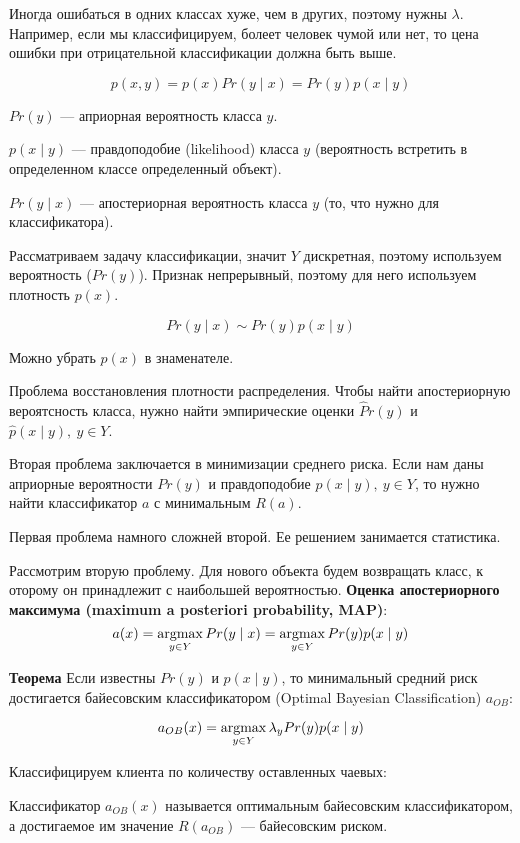 Иногда ошибаться в одних классах хуже, чем в других, поэтому нужны $\lambda$.
Например, если мы классифицируем, болеет человек чумой или нет, то цена ошибки
при отрицательной классификации должна быть выше.

\[
    p(x, y) = p(x) Pr(y \mid x) = Pr(y) p(x \mid y)
\]

$Pr(y)$ --- априорная вероятность класса $y$.

$p(x \mid y)$ --- правдоподобие (likelihood) класса $y$ (вероятность встретить
в определенном классе определенный объект).

$Pr(y \mid x)$ --- апостериорная вероятность класса $y$ (то, что нужно для
классификатора).

Рассматриваем задачу классификации, значит $Y$ дискретная, поэтому используем
вероятность ($Pr(y)$). Признак непрерывный, поэтому для него используем
плотность $p(x)$.

\[
    Pr(y \mid x) \sim Pr(y) p(x \mid y)
\]

Можно убрать $p(x)$ в знаменателе.

Проблема восстановления плотности распределения. Чтобы найти апостериорную
вероятсность класса, нужно найти эмпирические оценки $\hat Pr(y)$ и $\hat 
p(x \mid y),\ y \in Y$.

Вторая проблема заключается в минимизации среднего риска. Если нам даны
априорные вероятности $Pr(y)$ и правдоподобие $p(x \mid y),\ y \in Y$, то нужно
найти классификатор $a$ с минимальным $R(a)$.

Первая проблема намного сложней второй. Ее решением занимается статистика.

Рассмотрим вторую проблему. Для нового объекта будем возвращать класс, к
оторому он принадлежит с наибольшей вероятностью. \textbf{Оценка апостериорного
максимума (maximum a posteriori probability, MAP)}:
\[
    a(x) = \operatorname*{argmax}_{y\in Y} Pr(y \mid x) = \operatorname*{argmax}_{y \in Y} Pr(y) p(x \mid y)
\]

\textbf{Теорема} Если известны $Pr(y)$ и $p(x \mid y)$, то минимальный средний
риск достигается байесовским классификатором (Optimal Bayesian Classification) $a_{OB}$:

\[
    a_{OB}(x) = \operatorname*{argmax}_{y \in Y} \lambda_y Pr(y) p(x \mid y)
\]

Классифицируем клиента по количеству оставленных чаевых:


Классификатор $a_{OB}(x)$ называется оптимальным байесовским классификатором, а
достигаемое им значение $R(a_{OB})$ --- байесовским риском.

